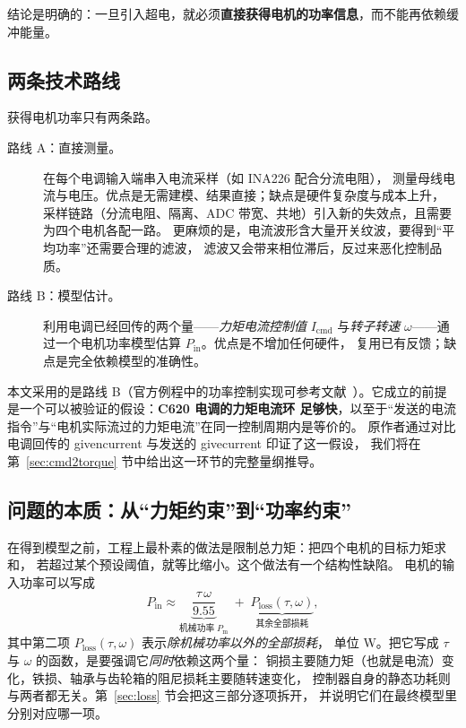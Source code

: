 \documentclass[cn,blue,11pt,device=normal]{elegantnote}
\newcommand{\code}[1]{{\ttfamily\small\def\_{\textunderscore\allowbreak}#1}}
\newcommand{\Pin}{P_{\mathrm{in}}{}}
\newcommand{\Pmech}{P_{\mathrm{m}}{}}
\newcommand{\Icmd}{I_{\mathrm{cmd}}{}}
\begin{document}
结论是明确的：一旦引入超电，就必须\textbf{直接获得电机的功率信息}，而不能再依赖缓冲能量。

\subsection{两条技术路线}

获得电机功率只有两条路。

\begin{description}
  \item[路线 A：直接测量。] 在每个电调输入端串入电流采样（如 INA226 配合分流电阻），
  测量母线电流与电压。优点是无需建模、结果直接；缺点是硬件复杂度与成本上升，
  采样链路（分流电阻、隔离、ADC 带宽、共地）引入新的失效点，且需要为四个电机各配一路。
  更麻烦的是，电流波形含大量开关纹波，要得到“平均功率”还需要合理的滤波，
  滤波又会带来相位滞后，反过来恶化控制品质。
  \item[路线 B：模型估计。] 利用电调已经回传的两个量——\emph{力矩电流控制值} $\Icmd$
  与\emph{转子转速} $\omega$——通过一个电机功率模型估算 $\Pin$。优点是不增加任何硬件，
  复用已有反馈；缺点是完全依赖模型的准确性。
\end{description}

本文采用的是路线 B（官方例程中的功率控制实现可参考文献~\cite{rmdevboard}）。它成立的前提是一个可以被验证的假设：\textbf{C620 电调的力矩电流环
足够快}，以至于“发送的电流指令”与“电机实际流过的力矩电流”在同一控制周期内是等价的。
原作者通过对比电调回传的 \code{given\_current} 与发送的 \code{give\_current} 印证了这一假设，
我们将在第~\ref{sec:cmd2torque} 节中给出这一环节的完整量纲推导。

\subsection{问题的本质：从“力矩约束”到“功率约束”}

在得到模型之前，工程上最朴素的做法是限制总力矩：把四个电机的目标力矩求和，
若超过某个预设阈值，就等比缩小。这个做法有一个结构性缺陷。
电机的输入功率可以写成
\begin{equation}\label{eq:pin-approx}
  \Pin \approx \underbrace{\frac{\tau\,\omega}{9.55}}_{\text{机械功率}\;\Pmech}
  \;+\; \underbrace{P_{\mathrm{loss}}(\tau,\omega)}_{\text{其余全部损耗}} ,
\end{equation}
其中第二项 $P_{\mathrm{loss}}(\tau,\omega)$ 表示\emph{除机械功率以外的全部损耗}，
单位 W。把它写成 $\tau$ 与 $\omega$ 的函数，是要强调它\emph{同时}依赖这两个量：
铜损主要随力矩（也就是电流）变化，铁损、轴承与齿轮箱的阻尼损耗主要随转速变化，
控制器自身的静态功耗则与两者都无关。第~\ref{sec:loss} 节会把这三部分逐项拆开，
并说明它们在最终模型里分别对应哪一项。
\end{document}
